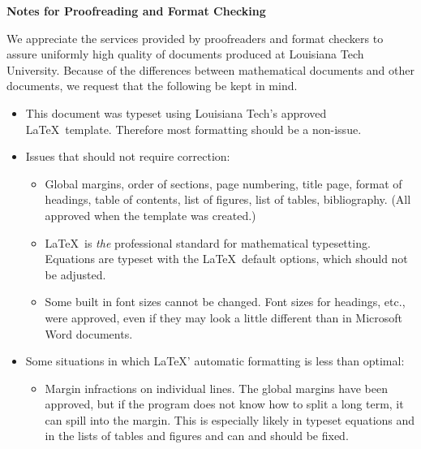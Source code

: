 \clearpage

\thispagestyle{empty}

\begin{singlespace}

\centerline{\bf Notes for Proofreading and Format Checking}

\vspace{.1in}

\noindent
We appreciate the services provided by proofreaders and format checkers to assure uniformly high quality of documents produced at Louisiana Tech University.
Because of the differences between mathematical documents and other documents, we request that the following be kept in mind.
\smallskip
\begin{itemize}
	\item This document was typeset using Louisiana Tech's approved \LaTeX \ template.
	Therefore most formatting should be a non-issue.
	
	\item Issues that should not require correction:

	\begin{itemize}
		\item Global margins, order of sections, page numbering, title page, format of headings, table of contents, list of figures, list of tables, bibliography.
		(All approved when the template was created.)
		
		\item \LaTeX\ is \emph{the} professional standard for mathematical typesetting.
		Equations are typeset with the \LaTeX\ default options, which should not be adjusted.
		
		\item Some built in font sizes cannot be changed.
		Font sizes for headings, etc., were approved, even if they may look a little different than in Microsoft Word documents.
	\end{itemize}

	\item Some situations in which \LaTeX' automatic formatting is less than optimal:

	\begin{itemize}
		\item Margin infractions on individual lines.
		The global margins have been approved, but if the program does not know how to split a long term, it can spill into the margin.
		This is especially likely in typeset equations and in the lists of tables and figures and can and should be fixed.
		

\end{itemize}
\end{itemize}
\end{singlespace}
